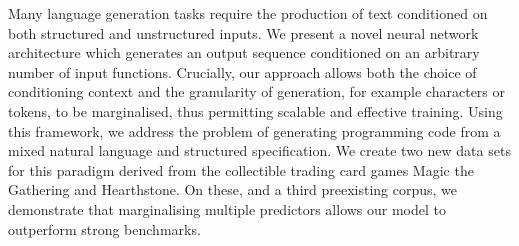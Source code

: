 Many language generation tasks require the production of text conditioned on both structured and unstructured inputs. We present a novel neural network architecture which generates an output sequence conditioned on an arbitrary number of input functions. Crucially, our approach allows both the choice of conditioning context and the granularity of generation, for example characters or tokens, to be marginalised, thus permitting scalable and effective training. Using this framework, we address the problem of generating programming code from a mixed natural language and structured specification. We create two new data sets for this paradigm derived from the collectible trading card games Magic the Gathering and Hearthstone. On these, and a third preexisting corpus, we demonstrate that marginalising multiple predictors allows our model to outperform strong benchmarks.
